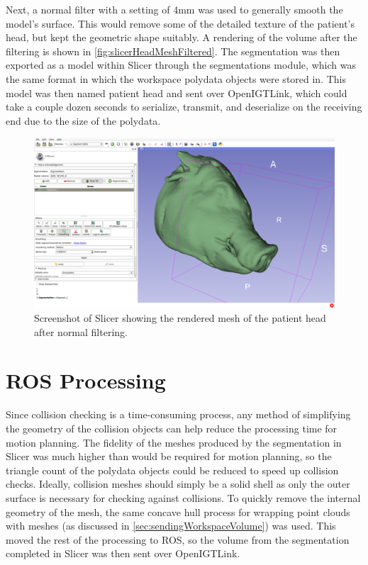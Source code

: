 \documentclass[12pt]{report}
\begin{document}
Next, a normal filter with a setting of 4mm was used to generally smooth the model's surface. This would remove some of the detailed texture of the patient's head, but kept the geometric shape suitably. A rendering of the volume after the filtering is shown in \autoref{fig:slicerHeadMeshFiltered}. The segmentation was then exported as a model within Slicer through the segmentations module, which was the same format in which the workspace polydata objects were stored in. This model was then named patient head and sent over OpenIGTLink, which could take a couple dozen seconds to serialize, transmit, and deserialize on the receiving end due to the size of the polydata.

\begin{figure}[thpb]
	\centering
	\includegraphics[width=\textwidth]{images/segmentation_smoothing.png}
    \caption{Screenshot of Slicer showing the rendered mesh of the patient head after normal filtering.}
    \label{fig:slicerHeadMeshFiltered}
\end{figure}


\section{ROS Processing}
Since collision checking is a time-consuming process, any method of simplifying the geometry of the collision objects can help reduce the processing time for motion planning. The fidelity of the meshes produced by the segmentation in Slicer was much higher than would be required for motion planning, so the triangle count of the polydata objects could be reduced to speed up collision checks. Ideally, collision meshes should simply be a solid shell as only the outer surface is necessary for checking against collisions. To quickly remove the internal geometry of the mesh, the same concave hull process for wrapping point clouds with meshes (as discussed in \autoref{sec:sendingWorkspaceVolume}) was used. This moved the rest of the processing to ROS, so the volume from the segmentation completed in Slicer was then sent over OpenIGTLink. 
\end{document}
